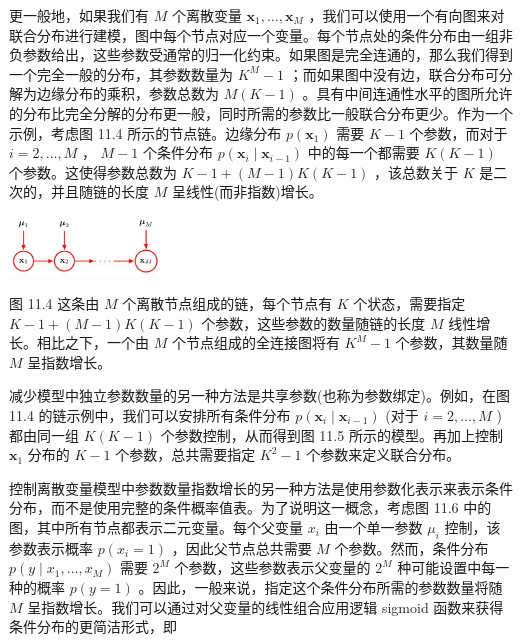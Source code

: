 \documentclass[10pt]{article}
\begin{document}
更一般地，如果我们有 \(M\) 个离散变量 \({\mathbf{x}}_{1},\ldots ,{\mathbf{x}}_{M}\) ，我们可以使用一个有向图来对联合分布进行建模，图中每个节点对应一个变量。每个节点处的条件分布由一组非负参数给出，这些参数受通常的归一化约束。如果图是完全连通的，那么我们得到一个完全一般的分布，其参数数量为 \({K}^{M} - 1\) ；而如果图中没有边，联合分布可分解为边缘分布的乘积，参数总数为 \(M\left( {K - 1}\right)\) 。具有中间连通性水平的图所允许的分布比完全分解的分布更一般，同时所需的参数比一般联合分布更少。作为一个示例，考虑图 11.4 所示的节点链。边缘分布 \(p\left( {\mathbf{x}}_{1}\right)\) 需要 \(K - 1\) 个参数，而对于 \(i = 2,\ldots ,M\) ， \(M - 1\) 个条件分布 \(p\left( {{\mathbf{x}}_{i} \mid  {\mathbf{x}}_{i - 1}}\right)\) 中的每一个都需要 \(K\left( {K - 1}\right)\) 个参数。这使得参数总数为 \(K - 1 + \left( {M - 1}\right) K\left( {K - 1}\right)\) ，该总数关于 \(K\) 是二次的，并且随链的长度 \(M\) 呈线性(而非指数)增长。

\begin{center}
\includegraphics[max width=0.3\textwidth]{images/0194e279-9b28-703a-88f4-c3ac21e2010d_350_1073_354_480_189_0.jpg}
\end{center}
\hspace*{3em} 

图 11.4 这条由 \(M\) 个离散节点组成的链，每个节点有 \(K\) 个状态，需要指定 \(K - 1 + \left( {M - 1}\right) K\left( {K - 1}\right)\) 个参数，这些参数的数量随链的长度 \(M\) 线性增长。相比之下，一个由 \(M\) 个节点组成的全连接图将有 \({K}^{M} - 1\) 个参数，其数量随 \(M\) 呈指数增长。

减少模型中独立参数数量的另一种方法是共享参数(也称为参数绑定)。例如，在图 11.4 的链示例中，我们可以安排所有条件分布 \(p\left( {{\mathbf{x}}_{i} \mid  {\mathbf{x}}_{i - 1}}\right)\) (对于 \(i = 2,\ldots ,M\) )都由同一组 \(K\left( {K - 1}\right)\) 个参数控制，从而得到图 11.5 所示的模型。再加上控制 \({\mathbf{x}}_{1}\) 分布的 \(K - 1\) 个参数，总共需要指定 \({K}^{2} - 1\) 个参数来定义联合分布。

控制离散变量模型中参数数量指数增长的另一种方法是使用参数化表示来表示条件分布，而不是使用完整的条件概率值表。为了说明这一概念，考虑图 11.6 中的图，其中所有节点都表示二元变量。每个父变量 \({x}_{i}\) 由一个单一参数 \({\mu }_{i}\) 控制，该参数表示概率 \(p\left( {{x}_{i} = 1}\right)\) ，因此父节点总共需要 \(M\) 个参数。然而，条件分布 \(p\left( {y \mid  {x}_{1},\ldots ,{x}_{M}}\right)\) 需要 \({2}^{M}\) 个参数，这些参数表示父变量的 \({2}^{M}\) 种可能设置中每一种的概率 \(p\left( {y = 1}\right)\) 。因此，一般来说，指定这个条件分布所需的参数数量将随 \(M\) 呈指数增长。我们可以通过对父变量的线性组合应用逻辑 sigmoid 函数来获得条件分布的更简洁形式，即
\end{document}
